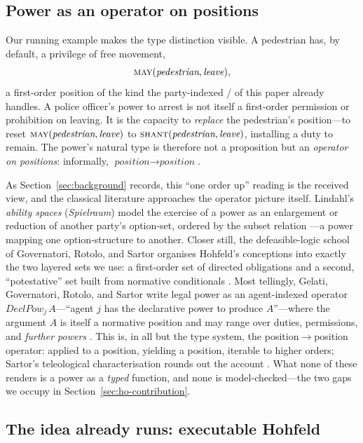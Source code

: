 \subsection{Power as an operator on positions}
\label{sec:received-view}

Our running example makes the type distinction visible. A pedestrian has, by
default, a privilege of free movement,
\[
  \textsc{may}(\textit{pedestrian}, \textit{leave}),
\]
a first-order position of the kind the party-indexed \MUST{}/\MAY{} of this
paper already handles. A police officer's power to arrest is not itself a
first-order permission or prohibition on leaving. It is the capacity to
\emph{replace} the pedestrian's position---to reset
$\textsc{may}(\textit{pedestrian},\textit{leave})$ to
$\textsc{shant}(\textit{pedestrian},\textit{leave})$, installing a duty to
remain. The power's natural type is therefore not a proposition but an
\emph{operator on positions}: informally, $\textit{position}\to\textit{position}$.

As Section~\ref{sec:background} records, this ``one order up'' reading is the
received view, and the classical literature approaches the operator picture
itself. Lindahl's \emph{ability spaces} (\emph{Spielraum}) model the exercise of
a power as an enlargement or reduction of another party's option-set, ordered by
the subset relation ---a power mapping one option-structure to
another. Closer still, the defeasible-logic school of Governatori, Rotolo, and
Sartor organises Hohfeld's conceptions into exactly the two layered sets we use:
a first-order set of directed obligations and a second, ``potestative'' set built
from normative conditionals . Most
tellingly, Gelati, Governatori, Rotolo, and Sartor write legal power as an
agent-indexed operator $\mathit{DeclPow}_{j}\,A$---``agent $j$ has the declarative
power to produce $A$''---where the argument $A$ is itself a normative position and
may range over duties, permissions, and \emph{further powers} . This is, in all but the type system, the position$\to$position operator:
applied to a position, yielding a position, iterable to higher orders; Sartor's
teleological characterisation rounds out the account . What none
of these renders is a power as a \emph{typed} function, and none is
model-checked---the two gaps we occupy in Section~\ref{sec:ho-contribution}.

\subsection{The idea already runs: executable Hohfeld}
\label{sec:executable-prior}

